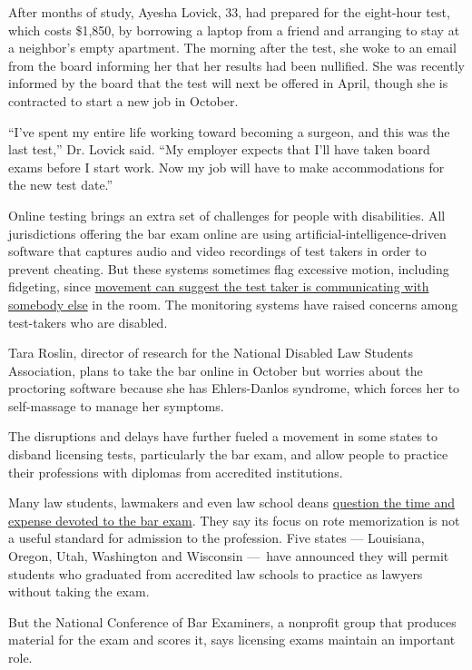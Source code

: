 After months of study, Ayesha Lovick, 33, had prepared for the
eight-hour test, which costs \$1,850, by borrowing a laptop from a
friend and arranging to stay at a neighbor's empty apartment. The
morning after the test, she woke to an email from the board informing
her that her results had been nullified. She was recently informed by
the board that the test will next be offered in April, though she is
contracted to start a new job in October.

``I've spent my entire life working toward becoming a surgeon, and this
was the last test,'' Dr. Lovick said. ``My employer expects that I'll
have taken board exams before I start work. Now my job will have to make
accommodations for the new test date.''

Online testing brings an extra set of challenges for people with
disabilities. All jurisdictions offering the bar exam online are using
artificial-intelligence-driven software that captures audio and video
recordings of test takers in order to prevent cheating. But these
systems sometimes flag excessive motion, including fidgeting, since
\href{https://www.insidehighered.com/news/2020/05/11/online-proctoring-surging-during-covid-19}{movement
can suggest the test taker is communicating with somebody else} in the
room. The monitoring systems have raised concerns among test-takers who
are disabled.

Tara Roslin, director of research for the National Disabled Law Students
Association, plans to take the bar online in October but worries about
the proctoring software because she has Ehlers-Danlos syndrome, which
forces her to self-massage to manage her symptoms.

The disruptions and delays have further fueled a movement in some states
to disband licensing tests, particularly the bar exam, and allow people
to practice their professions with diplomas from accredited
institutions.

Many law students, lawmakers and even law school deans
\href{https://www.nytimes3xbfgragh.onion/2015/03/20/business/dealbook/bar-exam-the-standard-to-become-a-lawyer-comes-under-fire.html}{question
the time and expense devoted to the bar exam}. They say its focus on
rote memorization is not a useful standard for admission to the
profession. Five states --- Louisiana, Oregon, Utah, Washington and
Wisconsin ---~have announced they will permit students who graduated
from accredited law schools to practice as lawyers without taking the
exam.

But the National Conference of Bar Examiners, a nonprofit group that
produces material for the exam and scores it, says licensing exams
maintain an important role.

